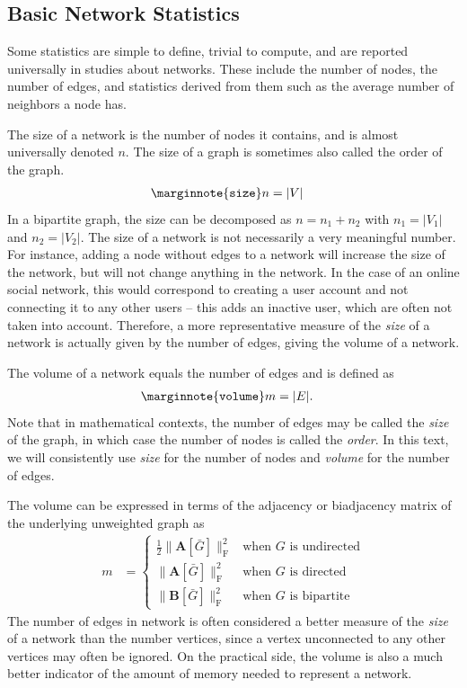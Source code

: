 \documentclass{article}
\begin{document}
\subsection{Basic Network Statistics}
Some statistics are simple to define, trivial to compute, and 
are reported universally in studies about networks.  These include the
number of nodes, the number of edges, and statistics derived from them
such as the average number of neighbors a node has.  

The size of a network is the number of nodes it contains, and
is almost universally denoted $n$.  The size of a graph is sometimes also
called the order of the graph. 
\begin{align}
  \marginnote{\texttt{size}}
  n &= |V|
\end{align}
In a bipartite graph, the size can be decomposed as $n = n_1 + n_2$ with
$n_1 = |V_1|$ and $n_2=|V_2|$.  The size of a network is not necessarily
a very meaningful number.  For instance, adding a node without edges to
a network will increase the size of the network, but will not change
anything in the network. In the case of an online social
network, this would correspond to creating a user account and not
connecting it to any other users -- this adds an inactive user, which
are often not taken into account.  Therefore, a more representative
measure of the \emph{size} of a network is actually given by the number
of edges, giving the volume of a network.

The volume of a network equals the number of edges and is defined as 
\begin{align}
  \marginnote{\texttt{volume}}
  m &= |E|. 
\end{align}
Note that in mathematical contexts, the number of edges may be called
the \emph{size} of the graph, in which case the number of nodes is
called the \emph{order}.  In this text, we will consistently use
\emph{size} for the number of nodes and \emph{volume} for the number of
edges. 

The volume can be expressed in terms of
the adjacency or biadjacency matrix of the underlying unweighted graph as
\begin{align}
  m &= \left\{ \begin{array}{ll}
    \frac 1 2 \| \mathbf A[\bar G] \|_{\mathrm F} ^2 &
    \text{when $G$ is undirected} \\
    \| \mathbf A[\bar G] \| _{\mathrm F} ^2 &
    \text{when $G$ is directed} \\
    \| \mathbf B[\bar G] \| _{\mathrm F} ^2 &    
    \text{when $G$ is bipartite}
    \end{array} \right.
\end{align}
The number of edges in network is often considered a better measure of
the \emph{size} of a network than the number vertices, since a vertex
unconnected to any other vertices may often be ignored.  On the
practical side, the volume is also a much better indicator of the amount
of memory needed to represent a network.
\end{document}
